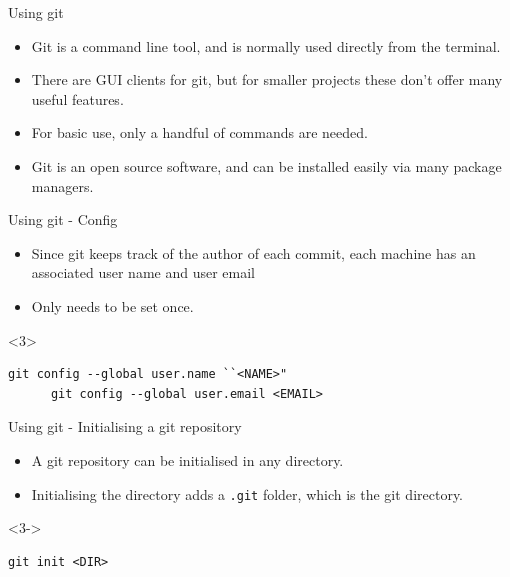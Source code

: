 \documentclass{beamer}
\begin{document}
\begin{frame}{Using git}
  \begin{itemize}
    \item<1-> Git is a command line tool, and is normally used directly from the terminal.
    \item<2-> There are GUI clients for git, but for smaller projects these don't offer many useful features. 
    \item<3-> For basic use, only a handful of commands are needed.
    \item<4-> Git is an open source software, and can be installed easily via many package managers. 
  \end{itemize}

\end{frame}

\begin{frame}[fragile]{Using git - Config}

    \begin{itemize}
      \item <1-> Since git keeps track of the author of each commit, each machine has an associated user name and user email 
      \item <2-> Only needs to be set once.
    \end{itemize}
    \begin{onlyenv}<3>
    \begin{lstlisting}[frame=single]
      git config --global user.name ``<NAME>"
      git config --global user.email <EMAIL>
    \end{lstlisting}
  \end{onlyenv}

\end{frame}

\begin{frame}[fragile]{Using git - Initialising a git repository}
 \begin{itemize}
    \item <1-> A git repository can be initialised in any directory. 
      \item<2-> Initialising the directory adds a \lstinline{.git} folder, which is the git directory.
  \end{itemize} 
  \begin{onlyenv}<3->
    \begin{lstlisting}[frame=single]
      git init <DIR>
    \end{lstlisting}
  \end{onlyenv}
\end{frame}
\end{document}
